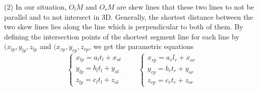 (2) In our situation, $O_lM$ and $O_rM$ are skew lines that these two lines to not be parallel and to not intersect in 3D. Generally, the shortest distance between the two skew lines lies along the line which is perpendicular to both of them. By defining the intersection points of the shortest segment line for each line by $(x_{lp}, y_{lp}, z_{lp}$ and $(x_{rp}, y_{rp}, z_{rp}$, we get the parametric equations
\begin{equation}  
	\left\{ 
	\begin{array}{lll} 
		x_{lp} = a_l t_l + x_{ol} \\
		y_{lp} = b_l t_l + y_{ol} \\
		z_{lp} = c_l t_l + z_{ol}
	\end{array} 
	\right.
	\qquad
		\left\{ 
	\begin{array}{lll} 
	x_{rp} = a_r l_r + x_{or} \\
	y_{rp} = b_r t_r + y_{or} \\
	z_{rp} = c_r t_r + z_{or}
	\end{array} 
	\right.
\end{equation}


